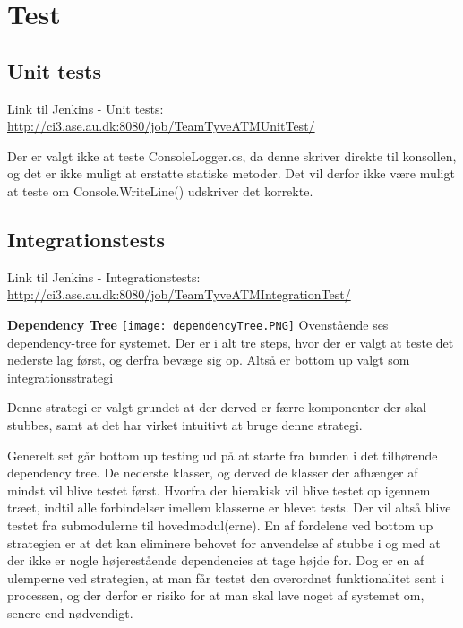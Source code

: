 \graphicspath{{Billeder/}}
\chapter{Test}
\section{Unit tests}
Link til Jenkins - Unit tests: \url{http://ci3.ase.au.dk:8080/job/TeamTyveATMUnitTest/} \newline 

Der er valgt ikke at teste ConsoleLogger.cs, da denne skriver direkte til konsollen, og det er ikke muligt at erstatte statiske metoder. Det vil derfor ikke være muligt at teste om Console.WriteLine() udskriver det korrekte. 

\section{Integrationstests}
Link til Jenkins - Integrationstests: \url{http://ci3.ase.au.dk:8080/job/TeamTyveATMIntegrationTest/} \newline

\textbf{Dependency Tree} \newline
\texttt{[image: dependencyTree.PNG]} \newline
Ovenstående ses dependency-tree for systemet. Der er i alt tre steps, hvor der er valgt at teste det nederste lag først, og derfra bevæge sig op. Altså er bottom up valgt som integrationsstrategi \newline

Denne strategi er valgt grundet at der derved er færre komponenter der skal stubbes, samt at det har virket intuitivt at bruge denne strategi.

Generelt set går bottom up testing ud på at starte fra bunden i det tilhørende dependency tree. De nederste klasser, og derved de klasser der afhænger af mindst vil blive testet først. Hvorfra der hierakisk vil blive testet op igennem træet, indtil alle forbindelser imellem klasserne er blevet tests. Der vil altså blive testet fra submodulerne til hovedmodul(erne).
En af fordelene ved bottom up strategien er at det kan eliminere behovet for anvendelse af stubbe i og med at der ikke er nogle højerestående dependencies at tage højde for. Dog er en af ulemperne ved strategien, at man får testet den overordnet funktionalitet sent i processen, og der derfor er risiko for at man skal lave noget af systemet om, senere end nødvendigt. \newline

